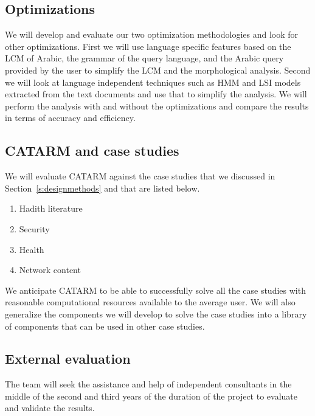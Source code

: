 \documentclass[12pt]{article}
\begin{document}
\subsection{Optimizations}

We will develop and evaluate our two optimization methodologies
and look for other optimizations. 
First we will use language specific features based on the 
LCM of Arabic, the grammar of the query language, and 
the Arabic query provided by the user to simplify 
the LCM and the morphological analysis. 
Second we will look at language independent techniques
such as HMM and LSI models extracted from the 
text documents and use that to simplify the analysis. 
We will perform the analysis with and without the optimizations
and compare the results in terms of accuracy and efficiency. 

\subsection{CATARM and case studies }

We will evaluate CATARM against the case studies
that we discussed in Section~\ref{s:designmethods}
and that are listed below. 
\begin{enumerate}
\item Hadith literature
\item Security
\item Health
\item Network content
\end{enumerate}

We anticipate CATARM to be able to successfully solve all the case
studies with reasonable computational resources available to the 
average user. 
We will also generalize the components we will develop to solve
the case studies into a library of components that can be used
in other case studies. 

\subsection{External evaluation }

The team will seek the assistance and help of independent 
consultants  in the middle of the second and third years of 
the duration of the project to evaluate and validate the results.
\end{document}
